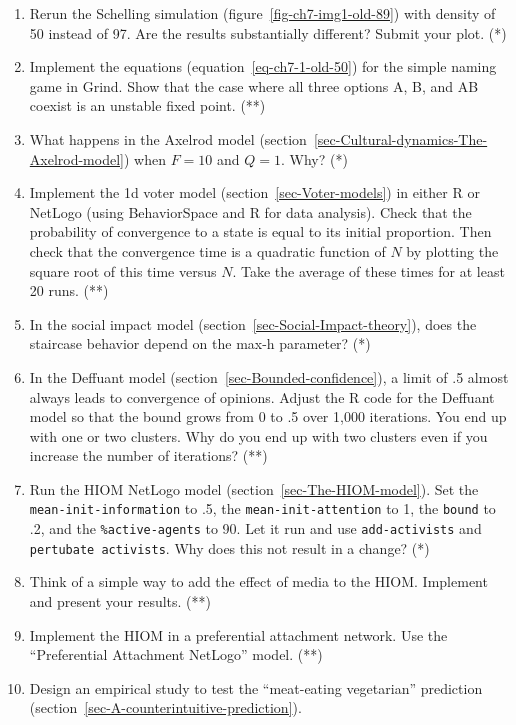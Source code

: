 \documentclass[
  a4paper,
  DIV=11,
  numbers=noendperiod,
  oneside]{scrreprt}
\begin{document}
\begin{enumerate}
\def\labelenumi{\arabic{enumi})}
\item
  Rerun the Schelling simulation (figure~\ref{fig-ch7-img1-old-89}) with
  density of 50 instead of 97. Are the results substantially different?
  Submit your plot. (*)
\item
  Implement the equations (equation~\ref{eq-ch7-1-old-50}) for the
  simple naming game in Grind. Show that the case where all three
  options A, B, and AB coexist is an unstable fixed point. (**)
\item
  What happens in the Axelrod model
  (section~\ref{sec-Cultural-dynamics-The-Axelrod-model}) when
  \(F = 10\) and \(Q = 1\). Why? (*)
\item
  Implement the 1d voter model (section~\ref{sec-Voter-models}) in
  either R or NetLogo (using BehaviorSpace and R for data analysis).
  Check that the probability of convergence to a state is equal to its
  initial proportion. Then check that the convergence time is a
  quadratic function of \(N\) by plotting the square root of this time
  versus \(N\). Take the average of these times for at least 20 runs.
  (**)
\item
  In the social impact model (section~\ref{sec-Social-Impact-theory}),
  does the staircase behavior depend on the max-h parameter? (*)
\item
  In the Deffuant model (section~\ref{sec-Bounded-confidence}), a limit
  of .5 almost always leads to convergence of opinions. Adjust the R
  code for the Deffuant model so that the bound grows from 0 to .5 over
  1,000 iterations. You end up with one or two clusters. Why do you end
  up with two clusters even if you increase the number of iterations?
  (**)
\item
  Run the HIOM NetLogo model (section~\ref{sec-The-HIOM-model}). Set the
  \texttt{mean-init-information} to .5, the \texttt{mean-init-attention}
  to 1, the \texttt{bound} to .2, and the \texttt{\%active-agents} to
  90. Let it run and use \texttt{add-activists} and
  \texttt{pertubate\ activists}. Why does this not result in a change?
  (*)
\item
  Think of a simple way to add the effect of media to the HIOM.
  Implement and present your results. (**)
\item
  Implement the HIOM in a preferential attachment network. Use the
  ``Preferential Attachment NetLogo'' model. (**)
\item
  Design an empirical study to test the ``meat-eating vegetarian''
  prediction (section~\ref{sec-A-counterintuitive-prediction}).
\end{enumerate}
\end{document}
